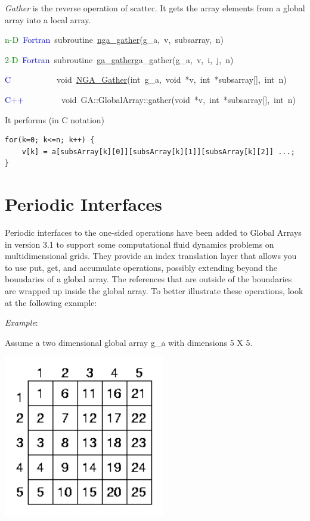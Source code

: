 \emph{Gather} is the reverse operation of scatter. It gets the array
elements from a global array into a local array.

\textcolor{green}{n-D}~\textcolor{blue}{Fortran}~subroutine~\href{https://hpc.pnl.gov/globalarrays/api/f_op_api.html\#ga_gather}{nga\_{}gather}(g\_a,~v,~subsarray,~n)~

\textcolor{green}{2-D}~\textcolor{blue}{Fortran}~subroutine~\href{https://hpc.pnl.gov/globalarrays/api/f_op_api.html\#ga_gather}{ga\_{}gather}ga\_gather(g\_a,~v,~i,~j,~n)~

\textcolor{blue}{C}~~~~~~~~~~~void~\href{https://hpc.pnl.gov/globalarrays/api/c_op_api.html\#ga_gather}{NGA\_{}Gather}(int~g\_a,~void~{*}v,~int~{*}subsarray{[}{]},~int~n)~

\textcolor{blue}{C++}~~~~~~~~~void~GA::GlobalArray::gather(void~{*}v,~int~{*}subsarray{[}{]},~int~n)

It performs (in C notation)
\begin{lstlisting}[style=cppnoframe]
for(k=0; k<=n; k++) {
    v[k] = a[subsArray[k][0]][subsArray[k][1]][subsArray[k][2]] ...;
}
\end{lstlisting}

\section{Periodic Interfaces }

Periodic interfaces to the one-sided operations have been added to
Global Arrays in version 3.1 to support some computational fluid dynamics
problems on multidimensional grids. They provide an index translation
layer that allows you to use put, get, and accumulate operations,
possibly extending beyond the boundaries of a global array. The references
that are outside of the boundaries are wrapped up inside the global
array. To better illustrate these operations, look at the following
example:

\emph{Example}: 

Assume a two dimensional global array g\_a with dimensions 5 X 5.

\includegraphics[width=7cm]{periodic1}

